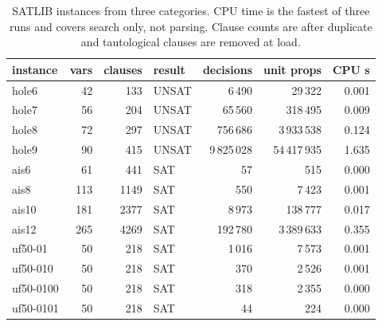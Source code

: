 \begin{table}[H]
\centering
\small
\begin{tabular}{lrrlrrr}
\toprule
instance & vars & clauses & result & decisions & unit props & CPU s \\
\midrule
hole6 & 42 & 133 & UNSAT & 6\,490 & 29\,322 & 0.001 \\
hole7 & 56 & 204 & UNSAT & 65\,560 & 318\,495 & 0.009 \\
hole8 & 72 & 297 & UNSAT & 756\,686 & 3\,933\,538 & 0.124 \\
hole9 & 90 & 415 & UNSAT & 9\,825\,028 & 54\,417\,935 & 1.635 \\
ais6 & 61 & 441 & SAT & 57 & 515 & 0.000 \\
ais8 & 113 & 1149 & SAT & 550 & 7\,423 & 0.001 \\
ais10 & 181 & 2377 & SAT & 8\,973 & 138\,777 & 0.017 \\
ais12 & 265 & 4269 & SAT & 192\,780 & 3\,389\,633 & 0.355 \\
uf50-01 & 50 & 218 & SAT & 1\,016 & 7\,573 & 0.001 \\
uf50-010 & 50 & 218 & SAT & 370 & 2\,526 & 0.001 \\
uf50-0100 & 50 & 218 & SAT & 318 & 2\,355 & 0.000 \\
uf50-0101 & 50 & 218 & SAT & 44 & 224 & 0.000 \\
\bottomrule
\end{tabular}
\caption{SATLIB instances from three categories. CPU time is the fastest of three runs and covers search only, not parsing. Clause counts are after duplicate and tautological clauses are removed at load.}
\label{tab:satlib}
\end{table}

